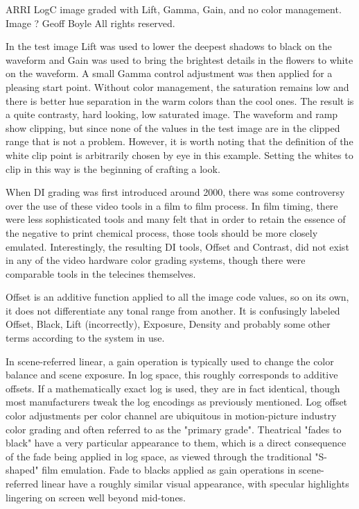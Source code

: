 ARRI LogC image graded with Lift, Gamma, Gain, and no color management. Image ? Geoff Boyle All rights reserved.

In the test image Lift was used to lower the deepest shadows to black on the waveform and Gain was used to bring the brightest details in the flowers to white on the waveform. A small Gamma control adjustment was then applied for a pleasing start point. Without color management, the saturation remains low and there is better hue separation in the warm colors than the cool ones. The result is a quite contrasty, hard looking, low saturated image. The waveform and ramp show clipping, but since none of the values in the test image are in the clipped range that is not a problem. However, it is worth noting that the definition of the white clip point is arbitrarily chosen by eye in this example. Setting the whites to clip in this way is the beginning of crafting a look.

When DI grading was first introduced around 2000, there was some controversy over the use of these video tools in a film to film process. In film timing, there were less sophisticated tools and many felt that in order to retain the essence of the negative to print chemical process, those tools should be more closely emulated. Interestingly, the resulting DI tools, Offset and Contrast, did not exist in any of the video hardware color grading systems, though there were comparable tools in the telecines themselves.

Offset is an additive function applied to all the image code values, so on its own, it does not differentiate any tonal range from another. It is confusingly labeled Offset, Black, Lift (incorrectly), Exposure, Density and probably some other terms according to the system in use.

In scene-referred linear, a gain operation is typically used to change the color balance and scene exposure. In log space, this roughly corresponds to additive offsets. If a mathematically exact log is used, they are in fact identical, though most manufacturers tweak the log encodings as previously mentioned. Log offset color adjustments per color channel are ubiquitous in motion-picture industry color grading and often referred to as the "primary grade". Theatrical "fades to black" have a very particular appearance to them, which is a direct consequence of the fade being applied in log space, as viewed through the traditional "S-shaped" film emulation. Fade to blacks applied as gain operations in scene-referred linear have a roughly similar visual appearance, with specular highlights lingering on screen well beyond mid-tones.


